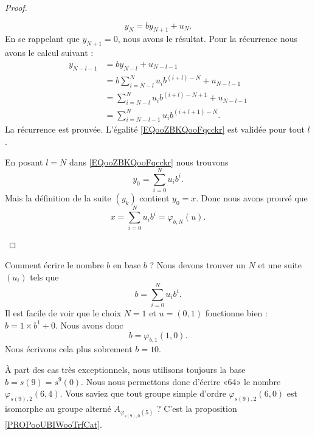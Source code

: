 \begin{proof}
\begin{subproof}
\begin{subproof}
\begin{equation}
				y_N=by_{N+1}+u_N.
			\end{equation}
			En se rappelant que \( y_{N+1}=0\), nous avons le résultat.
			\spitem[Pour \( l+1\)]
			Pour la récurrence nous avons le calcul suivant :
			\begin{subequations}
				\begin{align}
					y_{N-l-1} & =by_{N-l}+u_{N-l-1}                       \\
					          & =b\sum_{i=N-l}^Nu_ib^{(i+l)-N}+u_{N-l-1}  \\
					          & =\sum_{i=N-l}^Nu_ib^{(i+l)-N+1}+u_{N-l-1} \\
					          & =\sum_{i=N-l-1}^Nu_ib^{(i+l+1)-N}.
				\end{align}
			\end{subequations}
			La récurrence est prouvée. L'égalité \eqref{EQooZBKQooFqcckr} est validée pour tout \( l\).
		\end{subproof}
		En posant \( l=N\) dans \eqref{EQooZBKQooFqcckr} nous trouvons
		\begin{equation}
			y_0=\sum_{i=0}^Nu_ib^i.
		\end{equation}
		Mais la définition de la suite \( (y_k)\) contient \( y_0=x\). Donc nous avons prouvé que
		\begin{equation}
			x=\sum_{i=0}^Nu_ib^i=\varphi_{b,N}(u).
		\end{equation}
	\end{subproof}
\end{proof}

\begin{example}		\label{EXooEcritureDix}
	Comment écrire le nombre \( b\) en base \( b\) ? Nous devons trouver un \( N\) et une suite \( (u_i)\) tels que
	\begin{equation}
		b=\sum_{i=0}^Nu_ib^i.
	\end{equation}
	Il est facile de voir que le choix \( N=1\) et \( u=(0,1)\) fonctionne bien : \( b=1\times b^1+0\). Nous avons donc
	\begin{equation}
		b=\varphi_{b,1}(1,0).
	\end{equation}
	Nous écrivons cela plus sobrement \( b=10\).
\end{example}

\begin{normaltext}	\label{NORooBaseStandardDix}
	À part des cas très exceptionnels, nous utilisons toujours la base \( b=s(9)=s^9(0)\). Nous nous permettons donc d'écrire «64» le nombre \( \varphi_{s(9), 2}(6,4)\). Vous saviez que tout groupe simple d'ordre \( \varphi_{s(9), 2}(6,0)\) est isomorphe au groupe alterné \( A_{\varphi_{s(9),0}(5)}\) ? C'est la proposition \ref{PROPooUBIWooTrfCat}.
\end{normaltext}

